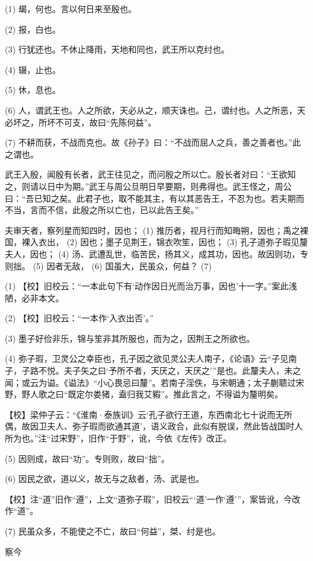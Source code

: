 \documentclass[12pt,UTF8]{ctexbook}
\begin{document}
(1) 朅，何也。言以何日来至殷也。

(2) 报，白也。

(3) 行犹还也。不休止降雨，天地和同也，武王所以克纣也。

(4) 辍，止也。

(5) 休，息也。

(6) 人，谓武王也。人之所欲，天必从之，顺天诛也。己，谓纣也。人之所恶，天必坏之，所坏不可支，故曰“先陈何益”。

(7) 不耕而获，不战而克也。故《孙子》曰：“不战而屈人之兵，善之善者也。”此之谓也。

武王入殷，闻殷有长者，武王往见之，而问殷之所以亡。殷长者对曰：“王欲知之，则请以日中为期。”武王与周公旦明日早要期，则弗得也。武王怪之，周公曰：“吾已知之矣。此君子也，取不能其主，有以其恶告王，不忍为也。若夫期而不当，言而不信，此殷之所以亡也，已以此告王矣。”

夫审天者，察列星而知四时，因也； (1) 推历者，视月行而知晦朔，因也；禹之裸国，裸入衣出， (2) 因也；墨子见荆王，锦衣吹笙，因也； (3) 孔子道弥子瑕见釐夫人，因也； (4) 汤、武遭乱世，临苦民，扬其义，成其功，因也。故因则功，专则拙。 (5) 因者无敌， (6) 国虽大，民虽众，何益？ (7)

(1) 【校】旧校云：“一本此句下有‘动作因日光而治万事，因也’十一字。”案此浅陋，必非本文。

(2) 【校】旧校云：“一本作‘入衣出否’。”

(3) 墨子好俭非乐，锦与笙非其所服也，而为之，因荆王之所欲也。

(4) 弥子瑕，卫灵公之幸臣也，孔子因之欲见灵公夫人南子，《论语》云“子见南子，子路不悦。夫子矢之曰‘予所不者，天厌之，天厌之’”是也。此釐夫人，未之闻；或云为谥。《谥法》“小心畏忌曰釐”。若南子淫佚，与宋朝通；太子蒯聩过宋野，野人歌之曰“既定尔娄猪，盍归我艾豭”。推此言之，不得谥为釐明矣。

【校】梁仲子云：“《淮南·泰族训》云‘孔子欲行王道，东西南北七十说而无所偶，故因卫夫人、弥子瑕而欲通其道’，语义政合，此似有脱误，然此皆战国时人所为也。”注“过宋野”，旧作“于野”，讹，今依《左传》改正。

(5) 因则成，故曰“功”。专则败，故曰“拙”。

(6) 因民之欲，道以义，故无与之敌者，汤、武是也。

【校】注“道”旧作“遵”，上文“道弥子瑕”，旧校云“‘道’一作‘遵’”，案皆讹，今改作“道”。

(7) 民虽众多，不能使之不亡，故曰“何益”，桀、纣是也。





察今
\end{document}
